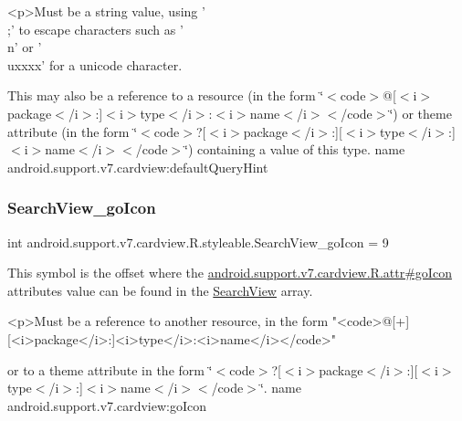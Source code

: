 \begin{DoxyVerb}      <p>Must be a string value, using '\\;' to escape characters such as '\\n' or '\\uxxxx' for a unicode character.
\end{DoxyVerb}
 

This may also be a reference to a resource (in the form \char`\"{}$<$code$>$@\mbox{[}$<$i$>$package$<$/i$>$\+:\mbox{]}$<$i$>$type$<$/i$>$\+:$<$i$>$name$<$/i$>$$<$/code$>$\char`\"{}) or theme attribute (in the form \char`\"{}$<$code$>$?\mbox{[}$<$i$>$package$<$/i$>$\+:\mbox{]}\mbox{[}$<$i$>$type$<$/i$>$\+:\mbox{]}$<$i$>$name$<$/i$>$$<$/code$>$\char`\"{}) containing a value of this type.  name android.\+support.\+v7.\+cardview\+:default\+Query\+Hint \mbox{\label{classandroid_1_1support_1_1v7_1_1cardview_1_1R_1_1styleable_ae419f144558b1d2950fe533ade9e622a}} 
\subsubsection{\texorpdfstring{Search\+View\+\_\+go\+Icon}{SearchView\_goIcon}}
{\footnotesize\ttfamily int android.\+support.\+v7.\+cardview.\+R.\+styleable.\+Search\+View\+\_\+go\+Icon = 9\hspace{0.3cm}{\ttfamily [static]}}

This symbol is the offset where the \hyperlink{classandroid_1_1support_1_1v7_1_1cardview_1_1R_1_1attr_a6a08e9ce5755d23319ad51ea7572e4fb}{android.\+support.\+v7.\+cardview.\+R.\+attr\#go\+Icon} attribute\textquotesingle{}s value can be found in the \hyperlink{classandroid_1_1support_1_1v7_1_1cardview_1_1R_1_1styleable_a6a300ecad88f70a7642265f73ff4d33f}{Search\+View} array.

\begin{DoxyVerb}      <p>Must be a reference to another resource, in the form "<code>@[+][<i>package</i>:]<i>type</i>:<i>name</i></code>"
\end{DoxyVerb}
 or to a theme attribute in the form \char`\"{}$<$code$>$?\mbox{[}$<$i$>$package$<$/i$>$\+:\mbox{]}\mbox{[}$<$i$>$type$<$/i$>$\+:\mbox{]}$<$i$>$name$<$/i$>$$<$/code$>$\char`\"{}.  name android.\+support.\+v7.\+cardview\+:go\+Icon \mbox{\label{classandroid_1_1support_1_1v7_1_1cardview_1_1R_1_1styleable_ae4178ec746e562d89135b15a735ff968}} 
